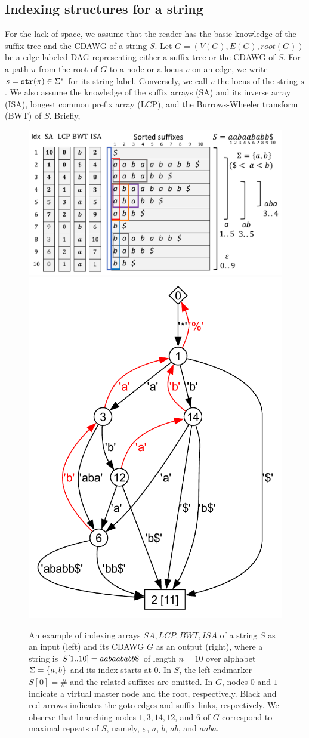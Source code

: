 \documentclass{article}
\begin{document}
\subsection{Indexing structures for a string}
For the lack of space, we assume that the reader has the basic knowledge of the suffix tree and the CDAWG of a string $S$. Let $G = (V(G), E(G), root(G))$ be a edge-labeled DAG representing either a suffix tree or the CDAWG of $S$. For a path $\pi$ from the root of $G$ to a node or a locus $v$ on an edge, we write $s = \mathtt{str}(\pi) \in \Sigma^*$ for its string label. Conversely, we call $v$ the locus of the string $s$. 
We also assume the knowledge of the suffix arrays (SA) and its inverse array (ISA), longest common prefix array (LCP), and the Burrows-Wheeler transform (BWT) of $S$. Briefly, 

\begin{figure}[t]
\centering  
\includegraphics[height=0.39\textwidth]{fig1.pdf}
\includegraphics[height=0.39\textwidth]{fig7.pdf}
\vspace{.5\baselineskip}
\caption{An example of indexing arrays $SA, LCP, BWT, ISA$ of a string $S$ as an input (left) and its CDAWG $G$ as an output (right),
where a string is $S[1..10] = aabaababb\daller$ of length $n = 10$ over alphabet $\Sigma = \{\kern0.05ema, b\kern0.05em\}$ and its index starts at $0$. 
  In $S$, the left endmarker $S[0]=\#$ and the related suffixes are omitted. In $G$, nodes $0$ and $1$ indicate a virtual master node and the root, respectively. Black and red arrows indicates the goto edges and suffix links, respectively. 
  We observe that branching nodes $1, 3,14,12$, and $6$ of $G$ correspond to maximal repeats of $S$, namely, $\varepsilon$, $a$, $b$, $ab$, and $aaba$. 
}\label{fig:example:arrays}
\end{figure}
\end{document}
